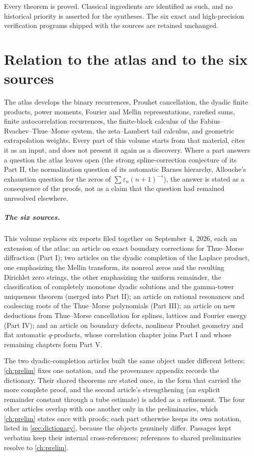 \documentclass[11pt,a4paper,oneside,openany]{book}
\numberwithin{equation}{chapter}
\theoremstyle{definition}
\theoremstyle{remark}
\newcommand{\eps}{\varepsilon}
\begin{document}
Every theorem is proved. Classical ingredients are identified as such, and no
historical priority is asserted for the syntheses. The six exact and
high-precision verification programs shipped with the sources are retained
unchanged.

\chapter*{Relation to the atlas and to the six sources}
The atlas \cite{atlas} develops the binary recurrences, Prouhet cancellation,
the dyadic finite products, power moments, Fourier and Mellin
representations, rarefied sums, finite autocorrelation recurrences, the
finite-block calculus of the Fabius--Rvachev--Thue--Morse system, the
zeta--Lambert tail calculus, and geometric extrapolation weights. Every part
of this volume starts from that material, cites it as an input, and does not
present it again as a discovery. Where a part answers a question the atlas
leaves open (the strong spline-correction conjecture of its Part II, the
normalization question of its automatic Barnes hierarchy, Allouche's
exhaustion question for the zeros of $\sum\eps_n(n+1)^{-s}$), the answer is
stated as a consequence of the proofs, not as a claim that the question had
remained unresolved elsewhere.

\paragraph{The six sources.}
This volume replaces six reports filed together on September 4, 2026, each
an extension of the atlas: an article on exact boundary corrections for
Thue--Morse diffraction (Part I); two articles on the dyadic completion of
the Laplace product, one emphasizing the Mellin transform, its nonreal zeros
and the resulting Dirichlet zero strings, the other emphasizing the uniform
remainder, the classification of completely monotone dyadic solutions and
the gamma-tower uniqueness theorem (merged into Part II); an article on
rational resonances and coalescing roots of the Thue--Morse polynomials
(Part III); an article on new deductions from Thue--Morse cancellation for
splines, lattices and Fourier energy (Part IV); and an article on boundary
defects, nonlinear Prouhet geometry and flat automatic $q$-products, whose
correlation chapter joins Part I and whose remaining chapters form Part V.

The two dyadic-completion articles built the same object under different
letters; \cref{ch:prelim} fixes one notation, and the provenance appendix
records the dictionary. Their shared theorems are stated once, in the form
that carried the more complete proof, and the second article's strengthening
(an explicit remainder constant through a tube estimate) is added as a
refinement. The four other articles overlap with one another only in the
preliminaries, which \cref{ch:prelim} states once with proofs; each part
otherwise keeps its own notation, listed in \cref{sec:dictionary}, because
the objects genuinely differ. Passages kept verbatim keep their internal
cross-references; references to shared preliminaries resolve to
\cref{ch:prelim}.
\end{document}
